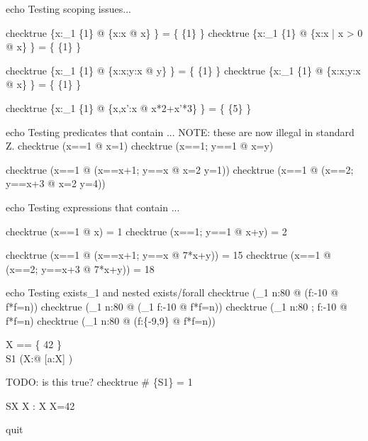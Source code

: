 %

echo Testing scoping issues...

checktrue \{x:\power_1 \{1\} @ \{x:x @ x\} \} = \{ \{1\} \}
checktrue \{x:\power_1 \{1\} @ \{x:x | x > 0 @ x\} \} = \{ \{1\} \}

checktrue \{x:\power_1 \{1\} @ \{x:x;y:x @ y\} \} = \{ \{1\} \}
checktrue \{x:\power_1 \{1\} @ \{x:x;y:x @ x\} \} = \{ \{1\} \}

checktrue \{x:\power_1 \{1\} @ \{x,x':x @ x*2+x'*3\} \} = \{ \{5\} \}


echo Testing predicates that contain \LET...
NOTE: these are now illegal in standard Z.
checktrue (\LET x==1 @ x=1)
checktrue (\LET x==1; y==1 @ x=y)

checktrue (\LET x==1 @ (\LET x==x+1; y==x @ x=2 \land y=1))
checktrue (\LET x==1 @ (\LET x==2; y==x+3 @ x=2 \land y=4))

echo Testing expressions that contain \LET...

checktrue (\LET x==1 @ x) = 1
checktrue (\LET x==1; y==1 @ x+y) = 2

checktrue (\LET x==1 @ (\LET x==x+1; y==x @ 7*x+y)) = 15
checktrue (\LET x==1 @ (\LET x==2; y==x+3 @ 7*x+y)) = 18


echo Testing exists_1 and nested exists/forall
checktrue       (\exists_1 n:80  @ (\exists f:-10  @ f*f=n))
checktrue \lnot (\exists_1 n:80  @ (\exists_1 f:-10  @ f*f=n))
checktrue \lnot (\exists_1 n:80 ; f:-10  @ f*f=n)
checktrue       (\exists_1 n:80  @ (\forall f:\{-9,9\} @ f*f=n))


\begin{zed}
   X == \{ 42 \} \\
   S1  (\exists X:\power \nat @ [a:X] \land [X:\power \nat | X=\emptyset])
\end{zed}

TODO: is this true?
checktrue \# \{S1\} = 1

\begin{schema}{SX}
    X : X
\where
    X=42
\end{schema}

quit

